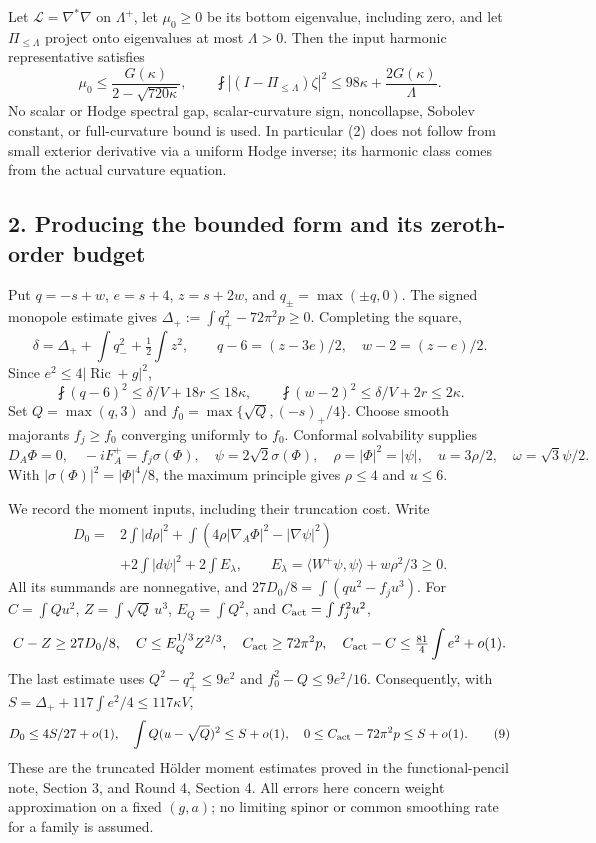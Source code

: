 \documentclass[
  11pt,
]{article}
\begin{document}
Let \(\mathscr L=\nabla^*\nabla\) on \(\Lambda^+\), let \(\mu_0\ge0\) be
its bottom eigenvalue, including zero, and let \(\Pi_{\le\Lambda}\)
project onto eigenvalues at most \(\Lambda>0\). Then the input harmonic
representative satisfies \[
 \boxed{
 \mu_0\le\frac{G(\kappa)}{2-\sqrt{720\kappa}},\qquad
 \fint|(I-\Pi_{\le\Lambda})\zeta|^2
       \le98\kappa+\frac{2G(\kappa)}{\Lambda}.}
 \tag{5}
\] No scalar or Hodge spectral gap, scalar-curvature sign, noncollapse,
Sobolev constant, or full-curvature bound is used. In particular (2)
does not follow from small exterior derivative via a uniform Hodge
inverse; its harmonic class comes from the actual curvature equation.

\hypertarget{producing-the-bounded-form-and-its-zeroth-order-budget}{%
\subsection{2. Producing the bounded form and its zeroth-order
budget}\label{producing-the-bounded-form-and-its-zeroth-order-budget}}

Put \(q=-s+w\), \(e=s+4\), \(z=s+2w\), and \(q_\pm=\max(\pm q,0)\). The
signed monopole estimate gives \(\Delta_+:=\int q_+^2-72\pi^2p\ge0\).
Completing the square, \[
 \delta=\Delta_++\int q_-^2+\tfrac12\int z^2,
 \qquad q-6=(z-3e)/2,\quad w-2=(z-e)/2.
 \tag{6}
\] Since \(e^2\le4|\operatorname{Ric}+g|^2\), \[
 \fint(q-6)^2\le\delta/V+18r\le18\kappa,
 \qquad \fint(w-2)^2\le\delta/V+2r\le2\kappa.
 \tag{7}
\] Set \(Q=\max(q,3)\) and \(f_0=\max\{\sqrt Q,(-s)_+/4\}\). Choose
smooth majorants \(f_j\ge f_0\) converging uniformly to \(f_0\).
Conformal solvability supplies \[
 D_A\Phi=0,\quad -iF_A^+=f_j\sigma(\Phi),\quad
 \psi=2\sqrt2\sigma(\Phi),\quad
 \rho=|\Phi|^2=|\psi|,\quad u=3\rho/2,
 \quad \omega=\sqrt3\psi/2.
 \tag{8}
\] With \(|\sigma(\Phi)|^2=|\Phi|^4/8\), the maximum principle gives
\(\rho\le4\) and \(u\le6\).

We record the moment inputs, including their truncation cost. Write \[
 \begin{split}
 D_0={}&2\int|d\rho|^2
 +\int(4\rho|\nabla_A\Phi|^2-|\nabla\psi|^2)\\
 &+2\int|d\psi|^2+2\int E_\lambda,\qquad
 E_\lambda=\langle W^+\psi,\psi\rangle+w\rho^2/3\ge0.
 \end{split}
\] All its summands are nonnegative, and \(27D_0/8=\int(qu^2-f_ju^3)\).
For \(C=\int Qu^2\), \(Z=\int\sqrt Q\,u^3\), \(E_Q=\int Q^2\), and
\(C_{\rm act}=\int f_j^2u^2\), \[
 C-Z\ge27D_0/8,\quad C\le E_Q^{1/3}Z^{2/3},\quad
 C_{\rm act}\ge72\pi^2p,\quad
 C_{\rm act}-C\le\tfrac{81}{4}\int e^2+o(1).
\] The last estimate uses \(Q^2-q_+^2\le9e^2\) and
\(f_0^2-Q\le9e^2/16\). Consequently, with
\(S=\Delta_++117\int e^2/4\le117\kappa V\), \[
 D_0\le4S/27+o(1),\quad
 \int Q(u-\sqrt Q)^2\le S+o(1),\quad
 0\le C_{\rm act}-72\pi^2p\le S+o(1).
 \tag{9}
\] These are the truncated Hölder moment estimates proved in the
functional-pencil note, Section 3, and Round 4, Section 4. All errors
here concern weight approximation on a fixed \((g,a)\); no limiting
spinor or common smoothing rate for a family is assumed.
\end{document}
